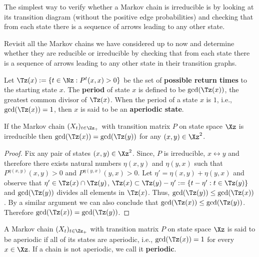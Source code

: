 The simplest way to verify whether a Markov chain is irreducible is by looking at its transition diagram (without the positive edge probabilities) and checking that from each state there is a sequence of arrows leading to any other state.  %

\begin{exercise}\label{EXR:ExsIrreducibleOrNot}
Revisit all the Markov chains we have considered up to now and determine whether they are reducible or irreducible by checking that from each state there is a sequence of arrows leading to any other state in their transition graphs.
\end{exercise}

\begin{definition}
Let $\Tz(x) := \{t \in \Nz : P^t(x,x)>0\}$ be the set of {\bf possible return times} to the starting state $x$.  The {\bf period} of state $x$ is defined to be $\gcd(\Tz(x))$, the greatest common divisor of $\Tz(x)$.  When the period of a state $x$ is $1$, i.e., $\gcd(\Tz(x))=1$, then $x$ is said to be an {\bf aperiodic state}.
\end{definition}

\begin{prop}
If the Markov chain $(X_t)_{t\in\Zz_+}$ with transition matrix $P$ on state space $\Xz$ is irreducible then $\gcd(\Tz(x)) = \gcd(\Tz(y))$ for any $(x,y) \in \Xz^2$.
\begin{proof}
Fix any pair of states $(x,y) \in \Xz^2$.  Since, $P$ is irreducible, $x \leftrightarrow y$ and therefore there exists natural numbers $\eta(x,y)$ and $\eta(y,x)$ such that $P^{\eta(x,y)}(x,y)>0$ and $P^{\eta(y,x)}(y,x)>0$.  Let $\eta' = \eta(x,y)+\eta(y,x)$ and observe that $\eta' \in \Tz(x) \cap \Tz(y)$, $\Tz(x) \subset \Tz(y) - \eta' := \{t-\eta' : t \in \Tz(y)\}$ and $\gcd(\Tz(y))$ divides all elements in $\Tz(x)$.  Thus, $\gcd(\Tz(y)) \leq \gcd(\Tz(x))$.  By a similar argument we can also conclude that $\gcd(\Tz(x)) \leq \gcd(\Tz(y))$.  Therefore $\gcd(\Tz(x))=\gcd(\Tz(y))$.
\end{proof}
\end{prop}

\begin{definition}[Aperiodic]
A Markov chain $(X_t)_{t\in\Zz_+}$ with transition matrix $P$ on state space $\Xz$ is said to be {aperiodic} if all of its states are aperiodic, i.e., $\gcd(\Tz(x))=1$ for every $x \in \Xz$.  If a chain is not aperiodic, we call it {\bf periodic}.
\end{definition}

